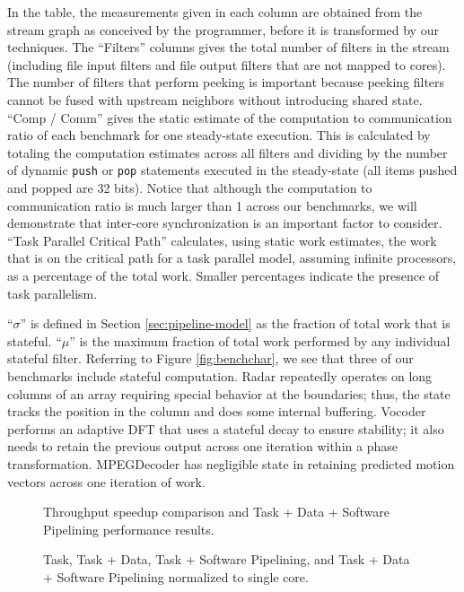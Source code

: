 In the table, the measurements given in each column are obtained from
the stream graph as conceived by the programmer, before it is
transformed by our techniques.  The ``Filters'' columns gives the
total number of filters in the stream (including file input filters
and file output filters that are not mapped to cores).  The number of
filters that perform peeking is important because peeking filters
cannot be fused with upstream neighbors without introducing shared
state. ``Comp / Comm'' gives the static estimate of the computation to
communication ratio of each benchmark for one steady-state
execution. This is calculated by totaling the computation estimates
across all filters and dividing by the number of dynamic {\tt push} or
{\tt pop} statements executed in the steady-state (all items pushed
and popped are 32 bits). Notice that although the computation to
communication ratio is much larger than 1 across our benchmarks, we
will demonstrate that inter-core synchronization is an important
factor to consider. ``Task Parallel Critical Path'' calculates, using
static work estimates, the work that is on the critical path for a
task parallel model, assuming infinite processors, as a percentage of
the total work.  Smaller percentages indicate the presence of task
parallelism.

``$\sigma$'' is defined in Section \ref{sec:pipeline-model} as the
fraction of total work that is stateful.  ``$\mu$'' is the maximum
fraction of total work performed by any individual stateful
filter. Referring to Figure \ref{fig:benchchar}, we see that three of
our benchmarks include stateful computation.  Radar repeatedly
operates on long columns of an array requiring special behavior at the
boundaries; thus, the state tracks the position in the column and does
some internal buffering.  Vocoder performs an adaptive DFT that uses a
stateful decay to ensure stability; it also needs to retain the
previous output across one iteration within a phase transformation.
MPEGDecoder has negligible state in retaining predicted motion vectors
across one iteration of work.

\begin{figure*}[t]
\centering
{}
\caption{Throughput speedup comparison and Task + Data + Software Pipelining performance results.
\protect\label{fig:thruput}}
\vspace{-6pt}
\end{figure*}

\begin{figure*}[t]
\centering
{}
\caption{Task, Task + Data, Task + Software Pipelining, and Task + Data + Software Pipelining
normalized to single core.
\protect\label{fig:main_comp}}
\vspace{-6pt}
\end{figure*}

